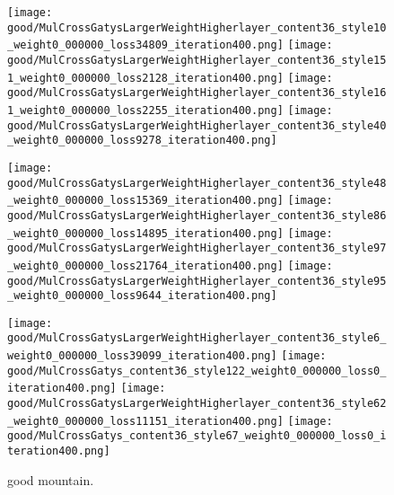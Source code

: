 \documentclass[runningheads]{llncs}
\begin{document}
\begin{figure*}[!htbp]
\centering
\small 

	\texttt{[image: good/MulCrossGatysLargerWeightHigherlayer\_content36\_style10\_weight0\_000000\_loss34809\_iteration400.png]}
    \texttt{[image: good/MulCrossGatysLargerWeightHigherlayer\_content36\_style151\_weight0\_000000\_loss2128\_iteration400.png]}
    \texttt{[image: good/MulCrossGatysLargerWeightHigherlayer\_content36\_style161\_weight0\_000000\_loss2255\_iteration400.png]}
    \texttt{[image: good/MulCrossGatysLargerWeightHigherlayer\_content36\_style40\_weight0\_000000\_loss9278\_iteration400.png]}
    
    \texttt{[image: good/MulCrossGatysLargerWeightHigherlayer\_content36\_style48\_weight0\_000000\_loss15369\_iteration400.png]}
    \texttt{[image: good/MulCrossGatysLargerWeightHigherlayer\_content36\_style86\_weight0\_000000\_loss14895\_iteration400.png]}
    \texttt{[image: good/MulCrossGatysLargerWeightHigherlayer\_content36\_style97\_weight0\_000000\_loss21764\_iteration400.png]}
    \texttt{[image: good/MulCrossGatysLargerWeightHigherlayer\_content36\_style95\_weight0\_000000\_loss9644\_iteration400.png]}
    
    \texttt{[image: good/MulCrossGatysLargerWeightHigherlayer\_content36\_style6\_weight0\_000000\_loss39099\_iteration400.png]}
    \texttt{[image: good/MulCrossGatys\_content36\_style122\_weight0\_000000\_loss0\_iteration400.png]}
    \texttt{[image: good/MulCrossGatysLargerWeightHigherlayer\_content36\_style62\_weight0\_000000\_loss11151\_iteration400.png]}
    \texttt{[image: good/MulCrossGatys\_content36\_style67\_weight0\_000000\_loss0\_iteration400.png]}
\caption{good mountain.  }
\label{fig:good1}
\end{figure*}
\end{document}
